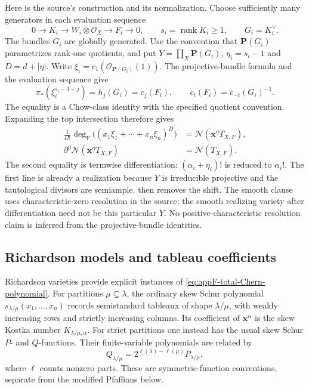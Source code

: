 Here is the source's construction and its normalization.
Choose sufficiently many generators in each evaluation sequence
\[
 0\longrightarrow K_i\longrightarrow W_i\otimes\mathcal O_X
            \longrightarrow F_i\longrightarrow0,
 \qquad s_i=\operatorname{rank}K_i\geq1,
 \qquad G_i=K_i^\vee.
\tag{F.25}\label{eq:appF-Chern-evaluation}
\]
The bundles $G_i$ are globally generated. Use the convention
that $\mathbf P(G_i)$ parametrizes rank-one quotients, and put
$Y=\prod_X\mathbf P(G_i)$, $\eta_i=s_i-1$ and
$D=d+|\eta|$. Write $\xi_i=c_1(\mathcal O_{\mathbf P(G_i)}(1))$.
The projective-bundle formula and the evaluation sequence give
\[
 \pi_*(\xi_i^{s_i-1+j})=h_j(G_i)=c_j(F_i),
 \qquad
 c_t(F_i)=c_{-t}(G_i)^{-1}.
\tag{F.26}\label{eq:appF-Chern-projective-push}
\]
The equality is a Chow-class identity with the specified quotient
convention. Expanding the top intersection therefore gives
\[
\begin{aligned}
 \frac1{D!}\deg_Y\bigl((x_1\xi_1+\cdots+x_n\xi_n)^D\bigr)
       &=\mathcal N(\mathbf x^\eta T_{X,F}),\\
 \partial^\eta\mathcal N(\mathbf x^\eta T_{X,F})
       &=\mathcal N(T_{X,F}).
\end{aligned}
\tag{F.27}\label{eq:appF-Chern-shift-removal}
\]
The second equality is termwise differentiation:
$(\alpha_i+\eta_i)!$ is reduced to $\alpha_i!$.
The first line is already a realization because $Y$ is
irreducible projective and the tautological divisors are semiample.
 then removes the shift.
The smooth clause uses characteristic-zero resolution in the
source; the smooth realizing variety after differentiation need
not be this particular $Y$. No positive-characteristic resolution
claim is inferred from the projective-bundle identities.

\subsection{Richardson models and tableau coefficients}
\label{sec:appF-Richardson-volume}

Richardson varieties provide explicit instances of
\eqref{eq:appF-total-Chern-polynomial}. For partitions
$\mu\subseteq\lambda$, the ordinary skew Schur polynomial
$s_{\lambda/\mu}(x_1,\ldots,x_n)$ records semistandard tableaux
of shape $\lambda/\mu$, with weakly increasing rows and strictly
increasing columns. Its coefficient of $\mathbf x^\alpha$ is
the skew Kostka number $K_{\lambda/\mu,\alpha}$. For strict
partitions one instead has the usual skew Schur $P$- and
$Q$-functions. Their finite-variable polynomials are related by
\[
 Q_{\lambda/\mu}
    =2^{\ell(\lambda)-\ell(\mu)}P_{\lambda/\mu},
\tag{F.28}\label{eq:appF-skew-P-Q-factor}
\]
where $\ell$ counts nonzero parts. These are symmetric-function
conventions, separate from the modified Pfaffians below.

